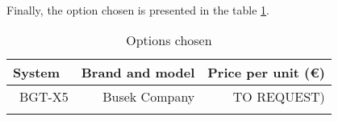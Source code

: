 \paragraph{}Finally, the option chosen is presented in the table \ref{structurefinal}.

\begin{longtable}{| l | r | r | }
\hline
\rowcolor[gray]{0.80}	\textbf{System} &  \textbf{Brand and model}     & \textbf{Price per unit (\euro)}   \\
\hline
\endfirsthead

	   ~BGT-X5 & Busek Company & TO REQUEST) \\
	\hline

\caption{Options chosen}
\label{structurefinal}
\end{longtable}
